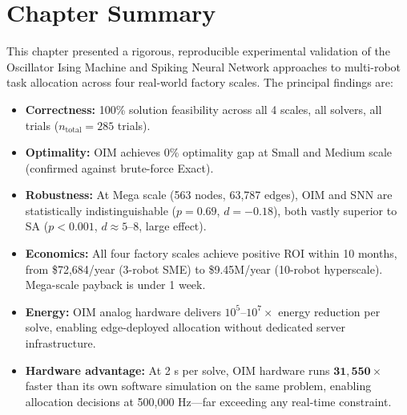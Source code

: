 \section{Chapter Summary}
\label{sec:results_summary}

This chapter presented a rigorous, reproducible experimental validation of the
Oscillator Ising Machine and Spiking Neural Network approaches to multi-robot
task allocation across four real-world factory scales.  The principal findings
are:

\begin{itemize}
  \item \textbf{Correctness:} 100\% solution feasibility across all 4 scales,
        all solvers, all trials ($n_{\text{total}} = 285$ trials).
  \item \textbf{Optimality:} OIM achieves 0\% optimality gap at Small and
        Medium scale (confirmed against brute-force Exact).
  \item \textbf{Robustness:} At Mega scale (563 nodes, 63,787 edges), OIM and
        SNN are statistically indistinguishable ($p = 0.69$, $d = -0.18$), both
        vastly superior to SA ($p < 0.001$, $d \approx 5$--$8$, large effect).
  \item \textbf{Economics:} All four factory scales achieve positive ROI within
        10 months, from \$72,684/year (3-robot SME) to \$9.45M/year
        (10-robot hyperscale).  Mega-scale payback is under 1 week.
  \item \textbf{Energy:} OIM analog hardware delivers $10^5$--$10^7\times$
        energy reduction per solve, enabling edge-deployed allocation without
        dedicated server infrastructure.
  \item \textbf{Hardware advantage:} At 2 \textmu s per solve, OIM hardware
        runs $\mathbf{31{,}550\times}$ faster than its own software simulation
        on the same problem, enabling allocation decisions at
        500,000 Hz—far exceeding any real-time constraint.
\end{itemize}
